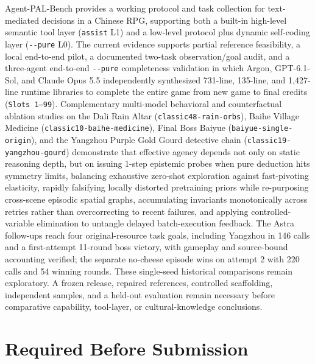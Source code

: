 \documentclass[11pt,a4paper]{article}
\begin{document}
Agent-PAL-Bench provides a working protocol and task collection for text-mediated decisions in a Chinese RPG, supporting both a built-in high-level semantic tool layer (\texttt{assist} L1) and a low-level protocol plus dynamic self-coding layer (\texttt{-\allowbreak{}-\allowbreak{}pure} L0). The current evidence supports partial reference feasibility, a local end-to-end pilot, a documented two-task observation/goal audit, and a three-agent end-to-end \texttt{-\allowbreak{}-\allowbreak{}pure} completeness validation in which Argon, GPT-6.1-Sol, and Claude Opus 5.5 independently synthesized 731-line, 135-line, and 1,427-line runtime libraries to complete the entire game from new game to final credits (\texttt{Slots\allowbreak{} \allowbreak{}1--99}). Complementary multi-model behavioral and counterfactual ablation studies on the Dali Rain Altar (\texttt{classic48\allowbreak{}-\allowbreak{}rain\allowbreak{}-\allowbreak{}orbs}), Baihe Village Medicine (\texttt{classic10\allowbreak{}-\allowbreak{}baihe\allowbreak{}-\allowbreak{}medicine}), Final Boss Baiyue (\texttt{baiyue\allowbreak{}-\allowbreak{}single\allowbreak{}-\allowbreak{}origin}), and the Yangzhou Purple Gold Gourd detective chain (\texttt{classic19\allowbreak{}-\allowbreak{}yangzhou\allowbreak{}-\allowbreak{}gourd}) demonstrate that effective agency depends not only on static reasoning depth, but on issuing 1-step epistemic probes when pure deduction hits symmetry limits, balancing exhaustive zero-shot exploration against fast-pivoting elasticity, rapidly falsifying locally distorted pretraining priors while re-purposing cross-scene episodic spatial graphs, accumulating invariants monotonically across retries rather than overcorrecting to recent failures, and applying controlled-variable elimination to untangle delayed batch-execution feedback. The Astra follow-ups reach four original-resource task goals, including Yangzhou in 146 calls and a first-attempt 11-round boss victory, with gameplay and source-bound accounting verified; the separate no-cheese episode wins on attempt 2 with 220 calls and 54 winning rounds. These single-seed historical comparisons remain exploratory. A frozen release, repaired references, controlled scaffolding, independent samples, and a held-out evaluation remain necessary before comparative capability, tool-layer, or cultural-knowledge conclusions.

\section*{\texorpdfstring{Required Before Submission}{Required Before Submission}}
\end{document}
